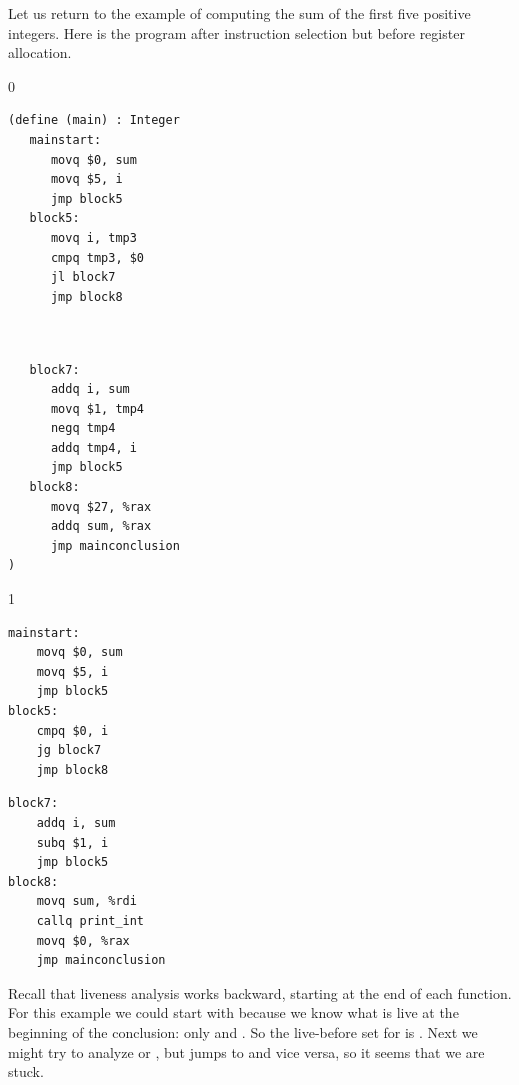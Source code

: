 \documentclass[7x10]{TimesAPriori_MIT}%
\def\racketEd{0}
\def\pythonEd{1}
\def\edition{0}
\numberwithin{theorem}{chapter}
\numberwithin{definition}{chapter}
\numberwithin{equation}{chapter}
\begin{document}
Let us return to the example of computing the sum of the first five
positive integers. Here is the program after instruction selection but
before register allocation.
\begin{center}
{\if\edition\racketEd    
  \begin{minipage}{0.45\textwidth}
\begin{lstlisting}
(define (main) : Integer
   mainstart:
      movq $0, sum
      movq $5, i
      jmp block5
   block5:
      movq i, tmp3
      cmpq tmp3, $0
      jl block7
      jmp block8
\end{lstlisting}
\end{minipage}
\begin{minipage}{0.45\textwidth}
  \begin{lstlisting}

    
   block7:
      addq i, sum
      movq $1, tmp4
      negq tmp4
      addq tmp4, i
      jmp block5
   block8:
      movq $27, %rax
      addq sum, %rax
      jmp mainconclusion
)
\end{lstlisting}
  \end{minipage}
\fi}
{\if\edition\pythonEd
\begin{minipage}{0.45\textwidth}
\begin{lstlisting}
mainstart:
	movq $0, sum
	movq $5, i
	jmp block5
block5:
	cmpq $0, i
	jg block7
	jmp block8
\end{lstlisting}
\end{minipage}
\begin{minipage}{0.45\textwidth}
\begin{lstlisting}
block7:
	addq i, sum
	subq $1, i
	jmp block5
block8:
	movq sum, %rdi
	callq print_int
	movq $0, %rax
	jmp mainconclusion
\end{lstlisting}
  \end{minipage}
\fi}
\end{center}
Recall that liveness analysis works backward, starting at the end
of each function. For this example we could start with 
because we know what is live at the beginning of the conclusion:
only  and . So the live-before set
for  is .
%
Next we might try to analyze  or , but
 jumps to  and vice versa, so it seems that
we are stuck.
\end{document}
